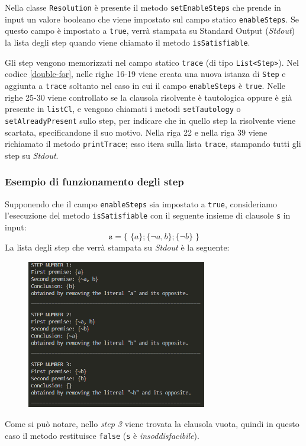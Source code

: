 \documentclass[a4paper,12pt]{report}
\begin{document}
Nella classe \texttt{Resolution} è presente il metodo \texttt{setEnableSteps} che prende in input un valore booleano che viene impostato sul campo statico \texttt{enableSteps}. Se questo campo è impostato a \texttt{true}, verrà stampata su Standard Output (\emph{Stdout}) la lista degli step quando viene chiamato il metodo \texttt{isSatisfiable}.

Gli step vengono memorizzati nel campo statico \texttt{trace} (di tipo \texttt{List<Step>}). Nel codice \ref{double-for}, nelle righe 16-19 viene creata una nuova istanza di \texttt{Step} e aggiunta a \texttt{trace} soltanto nel caso in cui il campo \texttt{enableSteps} è \texttt{true}. Nelle righe 25-30 viene controllato se la clausola risolvente è tautologica oppure è già presente in \texttt{listCl}, e vengono chiamati i metodi \texttt{setTautology} o \texttt{setAlreadyPresent} sullo step, per indicare che in quello step la risolvente viene scartata, specificandone il suo motivo. Nella riga 22 e nella riga 39 viene richiamato il metodo \texttt{printTrace}; esso itera sulla lista \texttt{trace}, stampando tutti gli step su \emph{Stdout}. 

\subsubsection{Esempio di funzionamento degli step}
Supponendo che il campo \texttt{enableSteps} sia impostato a \texttt{true}, consideriamo l'esecuzione del metodo \texttt{isSatisfiable} con il seguente insieme di clausole \texttt{s} in input:
\[\texttt{s} = \{\; \{a\}; \{\lnot a, b\}; \{\lnot b\} \;\}\]
La lista degli step che verrà stampata su \emph{Stdout} è la seguente:
\begin{figure}[H]
    \centering
    \includegraphics[width=0.7\textwidth, height=0.4\textheight]{img/step.png}
\end{figure} 
Come si può notare, nello \emph{step 3} viene trovata la clausola vuota, quindi in questo caso il metodo restituisce \texttt{false} (\texttt{s} è \emph{insoddisfacibile}).
\end{document}
